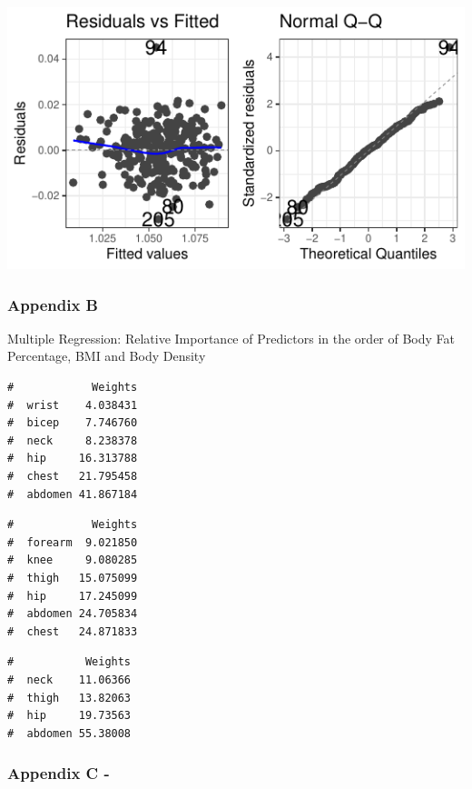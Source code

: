 \documentclass[a4paper,9pt,twocolumn,twoside,]{pinp}
\begin{document}
\begin{center}\includegraphics{Executive_Report_files/figure-latex/unnamed-chunk-5-3} \end{center}

\hypertarget{appendix-b}{%
\subsubsection{Appendix B}\label{appendix-b}}

Multiple Regression: Relative Importance of Predictors in the order of
Body Fat Percentage, BMI and Body Density

\begin{ShadedResult}
\begin{verbatim}
#            Weights
#  wrist    4.038431
#  bicep    7.746760
#  neck     8.238378
#  hip     16.313788
#  chest   21.795458
#  abdomen 41.867184
\end{verbatim}
\end{ShadedResult}
\begin{ShadedResult}
\begin{verbatim}
#            Weights
#  forearm  9.021850
#  knee     9.080285
#  thigh   15.075099
#  hip     17.245099
#  abdomen 24.705834
#  chest   24.871833
\end{verbatim}
\end{ShadedResult}
\begin{ShadedResult}
\begin{verbatim}
#           Weights
#  neck    11.06366
#  thigh   13.82063
#  hip     19.73563
#  abdomen 55.38008
\end{verbatim}
\end{ShadedResult}

\hypertarget{appendix-c--}{%
\subsubsection{Appendix C -}\label{appendix-c--}}
\end{document}
